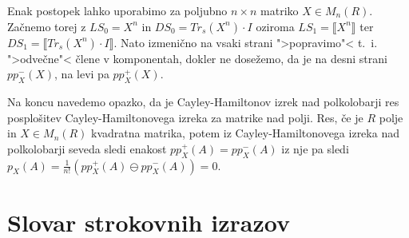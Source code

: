 \documentclass[mat1]{fmfdelo}
\begin{document}
Enak postopek lahko uporabimo za poljubno $n\times n$ matriko $X\in M_n(R)$. Začnemo torej z $LS_0 = X^n$ in $DS_0 = Tr_s(X^n)\cdot I$ oziroma $LS_1 = \llbracket X^n \rrbracket$ ter $DS_1 = \llbracket Tr_s(X^n)\cdot I\rrbracket$. Nato izmenično na vsaki strani ">popravimo"< t.~i.~ ">odvečne"< člene v komponentah, dokler ne dosežemo, da je na desni strani $pp_X^{-}(X)$, na levi pa $pp_X^{+}(X)$.

Na koncu navedemo opazko, da je Cayley-Hamiltonov izrek nad polkolobarji res posplošitev Cayley-Hamiltonovega izreka za matrike nad polji. Res, če je $R$ polje in $X\in M_n(R)$ kvadratna matrika, potem iz Cayley-Hamiltonovega izreka nad polkolobarji seveda sledi enakost $pp_X^{+}(A) = pp_X^{-}(A)$ iz nje pa sledi $p_X(A) = \frac{1}{n!}(pp_X^{+}(A) \ominus pp_X^{-}(A)) = 0$.
\section*{Slovar strokovnih izrazov}
\end{document}
